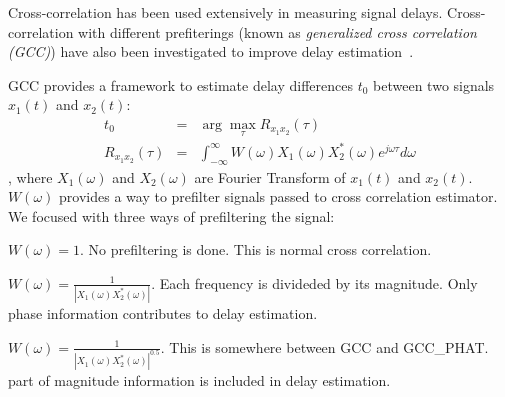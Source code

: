 Cross-correlation has been used extensively in measuring signal delays\cite{tdoa:mit2, tdoa:3}. Cross-correlation with different prefiterings (known as \emph{generalized cross correlation (GCC)}) have also been investigated to improve delay estimation~\cite{tdoa:gcc1,tdoa:gcc2,tdoa:gcc3}.

GCC provides a framework to estimate delay differences $t_0$ between two signals $x_1(t)$ and $x_2(t)$:
\begin{eqnarray} \label{eq:gcc}
t_0 &=& \arg\max_{\tau} R_{x_1x_2}(\tau) \\
R_{x_1x_2}(\tau) &=& \int_{-\infty}^\infty W(\omega) X_1(\omega) X_2^{*}(\omega) e^{j\omega\tau} d\omega
\end{eqnarray}
, where $X_1(\omega)$ and $X_2(\omega)$ are Fourier Transform of $x_1(t)$ and $x_2(t)$. $W(\omega)$ provides a way to prefilter signals passed to cross correlation estimator. We focused with three ways of prefiltering the signal:
\begin{description}
\item[GCC] $W(\omega) = 1$. No prefiltering is done. This is normal cross correlation.
\item[GCC\_PHAT] $W(\omega) = \frac{1}{\left|X_1(\omega)X_2^{*}(\omega)\right|}$. Each frequency is divideded by its magnitude. Only phase information contributes to delay estimation.
\item[GCC\_PHAT\_SQRT] $W(\omega) = \frac{1}{\left|X_1(\omega)X_2^*(\omega)\right|^{0.5}}$. This is somewhere between GCC and GCC\_PHAT. part of magnitude information is included in delay estimation.
\end{description}
